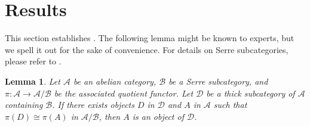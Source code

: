 \documentclass[11pt]{amsart}
\theoremstyle{plain}
\newtheorem{lemma}[theorem]{Lemma}
\theoremstyle{definition}
\numberwithin{equation}{section}
\numberwithin{theorem}{section}
\begin{document}
\section{Results}
\label{sec:results}

This section establishes . The following lemma might be known to experts, but we spell it out for the sake of convenience. For details on Serre subcategories, please refer to \cite[\href{https://stacks.math.columbia.edu/tag/02MN}{Tag 02MN}]{StacksProject}.

\begin{lemma}\label{lem:quotient_functor_reflects_isomorphism_up_to_generation}
    Let $\mathcal{A}$ be an abelian category, $\mathcal{B}$ be a Serre subcategory, and $\pi\colon \mathcal{A} \to \mathcal{A}/\mathcal{B}$ be the associated quotient functor. Let $\mathcal{D}$ be a thick subcategory of $\mathcal{A}$ containing $\mathcal{B}$. If there exists objects $D$ in $\mathcal{D}$ and $A$ in $\mathcal{A}$ such that $\pi(D) \cong \pi(A)$ in $\mathcal{A}/\mathcal{B}$, then $A$ is an object of $\mathcal{D}$.
\end{lemma}
\end{document}
